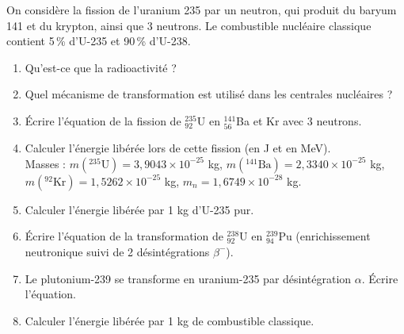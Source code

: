 \documentclass[12pt,a4paper]{article}
\begin{document}
\begin{boiteexercice}
On considère la fission de l'uranium 235 par un neutron, qui produit du baryum 141 et du krypton, ainsi que 3 neutrons. Le combustible nucléaire classique contient 5\,\% d'U-235 et 90\,\% d'U-238.
\begin{enumerate}
  \item Qu'est-ce que la radioactivité ?
  \item Quel mécanisme de transformation est utilisé dans les centrales nucléaires ?
  \item Écrire l'équation de la fission de ${}_{92}^{235}$U en ${}_{56}^{141}$Ba et Kr avec 3 neutrons.
  \item Calculer l'énergie libérée lors de cette fission (en J et en MeV).\\
    Masses : $m({}^{235}\text{U}) = 3{,}9043\times10^{-25}$ kg, $m({}^{141}\text{Ba}) = 2{,}3340\times10^{-25}$ kg, $m({}^{92}\text{Kr}) = 1{,}5262\times10^{-25}$ kg, $m_n = 1{,}6749\times10^{-28}$ kg.
  \item Calculer l'énergie libérée par 1 kg d'U-235 pur.
  \item Écrire l'équation de la transformation de ${}_{92}^{238}$U en ${}_{94}^{239}$Pu (enrichissement neutronique suivi de 2 désintégrations $\beta^-$).
  \item Le plutonium-239 se transforme en uranium-235 par désintégration $\alpha$. Écrire l'équation.
  \item Calculer l'énergie libérée par 1 kg de combustible classique.
\end{enumerate}
\end{boiteexercice}
\end{document}
